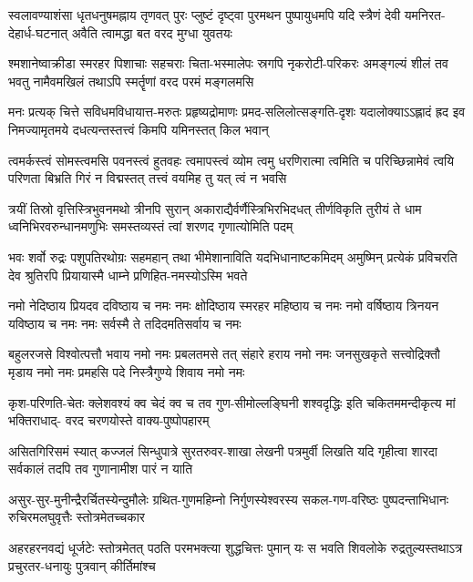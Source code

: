 \fourlineindentedshloka
{स्वलावण्याशंसा धृतधनुषमह्नाय तृणवत्}
{पुरः प्लुष्टं दृष्ट्वा पुरमथन पुष्पायुधमपि}
{यदि स्त्रैणं देवी यमनिरत-देहार्ध-घटनात्}
{अवैति त्वामद्धा बत वरद मुग्धा युवतयः}%

\fourlineindentedshloka
{श्मशानेष्वाक्रीडा स्मरहर पिशाचाः सहचराः}
{चिता-भस्मालेपः स्रगपि नृकरोटी-परिकरः}
{अमङ्गल्यं शीलं तव भवतु नामैवमखिलं}
{तथाऽपि स्मर्तॄणां वरद परमं मङ्गलमसि}%

\fourlineindentedshloka
{मनः प्रत्यक् चित्ते सविधमविधायात्त-मरुतः}
{प्रहृष्यद्रोमाणः प्रमद-सलिलोत्सङ्गति-दृशः}
{यदालोक्याऽऽह्लादं ह्रद इव निमज्यामृतमये}
{दधत्यन्तस्तत्त्वं किमपि यमिनस्तत् किल भवान्}%

\fourlineindentedshloka
{त्वमर्कस्त्वं सोमस्त्वमसि पवनस्त्वं हुतवहः}
{त्वमापस्त्वं व्योम त्वमु धरणिरात्मा त्वमिति च}
{परिच्छिन्नामेवं त्वयि परिणता बिभ्रति गिरं}
{न विद्मस्तत् तत्त्वं वयमिह तु यत् त्वं न भवसि}%

\fourlineindentedshloka
{त्रयीं तिस्रो वृत्तिस्त्रिभुवनमथो त्रीनपि सुरान्}
{अकाराद्यैर्वर्णैस्त्रिभिरभिदधत् तीर्णविकृति}
{तुरीयं ते धाम ध्वनिभिरवरुन्धानमणुभिः}
{समस्तव्यस्तं त्वां शरणद गृणात्योमिति पदम्}%

\fourlineindentedshloka
{भवः शर्वो रुद्रः पशुपतिरथोग्रः सहमहान्}
{तथा भीमेशानाविति यदभिधानाष्टकमिदम्}
{अमुष्मिन् प्रत्येकं प्रविचरति देव श्रुतिरपि}
{प्रियायास्मै धाम्ने प्रणिहित-नमस्योऽस्मि भवते}%

\fourlineindentedshloka
{नमो नेदिष्ठाय प्रियदव दविष्ठाय च नमः}
{नमः क्षोदिष्ठाय स्मरहर महिष्ठाय च नमः}
{नमो वर्षिष्ठाय त्रिनयन यविष्ठाय च नमः}
{नमः सर्वस्मै ते तदिदमतिसर्वाय च नमः}%

\fourlineindentedshloka
{बहुलरजसे विश्वोत्पत्तौ भवाय नमो नमः}
{प्रबलतमसे तत् संहारे हराय नमो नमः}
{जनसुखकृते सत्त्वोद्रिक्तौ मृडाय नमो नमः}
{प्रमहसि पदे निस्त्रैगुण्ये शिवाय नमो नमः}%

\fourlineindentedshloka
{कृश-परिणति-चेतः क्लेशवश्यं क्व चेदं}
{क्व च तव गुण-सीमोल्लङ्घिनी शश्वदृद्धिः}
{इति चकितममन्दीकृत्य मां भक्तिराधाद्-}
{वरद चरणयोस्ते वाक्य-पुष्पोपहारम्}%

\fourlineindentedshloka
{असितगिरिसमं स्यात् कज्जलं सिन्धुपात्रे}
{सुरतरुवर-शाखा लेखनी पत्रमुर्वी}
{लिखति यदि गृहीत्वा शारदा सर्वकालं}
{तदपि तव गुणानामीश पारं न याति}%

\fourlineindentedshloka
{असुर-सुर-मुनीन्द्रैरर्चितस्येन्दुमौलेः}
{ग्रथित-गुणमहिम्नो निर्गुणस्येश्वरस्य}
{सकल-गण-वरिष्ठः पुष्पदन्ताभिधानः}
{रुचिरमलघुवृत्तैः स्तोत्रमेतच्चकार}%

\fourlineindentedshloka
{अहरहरनवद्यं धूर्जटेः स्तोत्रमेतत्}
{पठति परमभक्त्या शुद्धचित्तः पुमान् यः}
{स भवति शिवलोके रुद्रतुल्यस्तथाऽत्र}
{प्रचुरतर-धनायुः पुत्रवान् कीर्तिमांश्च}%

